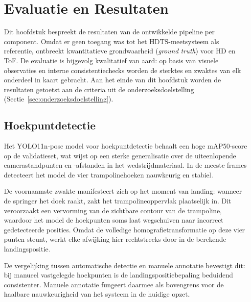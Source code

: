 
\chapter{Evaluatie en Resultaten}
\label{ch:evaluatie}

Dit hoofdstuk bespreekt de resultaten van de ontwikkelde pipeline per component. Omdat er geen toegang was tot het HDTS-meetsysteem als referentie, ontbreekt kwantitatieve grondwaarheid (\textit{ground truth}) voor HD en ToF. De evaluatie is bijgevolg kwalitatief van aard: op basis van visuele observaties en interne consistentiechecks worden de sterktes en zwaktes van elk onderdeel in kaart gebracht. Aan het einde van dit hoofdstuk worden de resultaten getoetst aan de criteria uit de onderzoeksdoelstelling (Sectie~\ref{sec:onderzoeksdoelstelling}).


\section{Hoekpuntdetectie}
\label{sec:evaluatie-hoekpunten}

Het YOLO11n-pose model voor hoekpuntdetectie behaalt een hoge mAP50-score op de validatieset, wat wijst op een sterke generalisatie over de uiteenlopende camerastandpunten en -afstanden in het wedstrijdmateriaal. In de meeste frames detecteert het model de vier trampolinehoeken nauwkeurig en stabiel.

De voornaamste zwakte manifesteert zich op het moment van landing: wanneer de springer het doek raakt, zakt het trampolineoppervlak plaatselijk in. Dit veroorzaakt een vervorming van de zichtbare contour van de trampoline, waardoor het model de hoekpunten soms laat wegschuiven naar incorrect gedetecteerde posities. Omdat de volledige homografietransformatie op deze vier punten steunt, werkt elke afwijking hier rechtstreeks door in de berekende landingspositie.

De vergelijking tussen automatische detectie en manuele annotatie bevestigt dit: bij manueel vastgelegde hoekpunten is de landingspositiebepaling beduidend consistenter. Manuele annotatie fungeert daarmee als bovengrens voor de haalbare nauwkeurigheid van het systeem in de huidige opzet.

